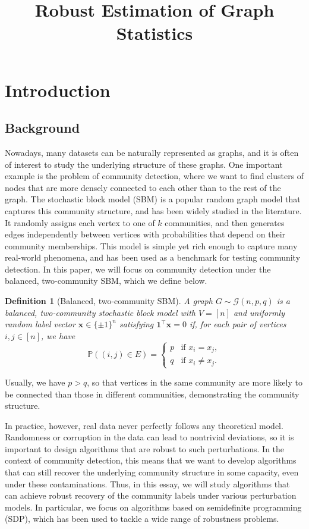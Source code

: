 \documentclass[11pt, titlepage]{article} %
\title{Robust Estimation of Graph Statistics}
\date{}
\numberwithin{equation}{section}
\newtheorem{definition}{Definition}
\theoremstyle{definition}
\numberwithin{theorem}{section}
\numberwithin{lemma}{section}
\numberwithin{corollary}{section}
\numberwithin{proposition}{section}
\numberwithin{definition}{section}
\numberwithin{remark}{section}
\begin{document}
\maketitle
{}
\tableofcontents
\newpage
\setcounter{page}{1}
\section{Introduction}
\subsection{Background}
Nowadays, many datasets can be naturally represented as graphs, and it is often of interest to study
the underlying structure of these graphs. One important example is the problem of community detection, 
where we want to find clusters of nodes that are more densely connected to each other than to the
rest of the graph. The stochastic block model (SBM) is a popular random graph model that captures
this community structure, and has been widely studied in the literature. It randomly assigns each 
vertex to one of $k$ communities, and then generates edges independently between vertices with 
probabilities that depend on their community memberships. This model is simple yet rich enough to
capture many real-world phenomena, and has been used as a benchmark for testing community detection.
In this paper, we will focus on community detection under the balanced, two-community SBM, which
we define below.
\begin{definition}[Balanced, two-community SBM]
A graph $G \sim \mathcal{G}(n, p, q)$ is a balanced, two-community stochastic block model with 
$V = [n]$ and uniformly random label vector $\bm{x} \in \{\pm 1\}^n$ satisfying $\bm{1}^\top \bm{x} = 0$
if, for each pair of vertices $i, j \in [n]$, we have
\[\mathbb{P}((i,j) \in E) = \begin{cases}
p & \text{if } x_i = x_j, \\
q & \text{if } x_i \neq x_j.
\end{cases}\] 
\end{definition}
Usually, we have $p > q$, so that vertices in the same community are more likely to be connected 
than those in different communities, demonstrating the community structure.

In practice, however, real data never perfectly follows any theoretical model. Randomness or corruption
in the data can lead to nontrivial deviations, so it is important to design algorithms that are 
robust to such perturbations. In the context of community detection, this means that we want to
develop algorithms that can still recover the underlying community structure in some capacity,
even under these contaminations. Thus, in this essay, we will study algorithms that can achieve
robust recovery of the community labels under various perturbation models. In particular, 
we focus on algorithms based on semidefinite programming (SDP), which has been used to tackle a wide
range of robustness problems.
\end{document}
